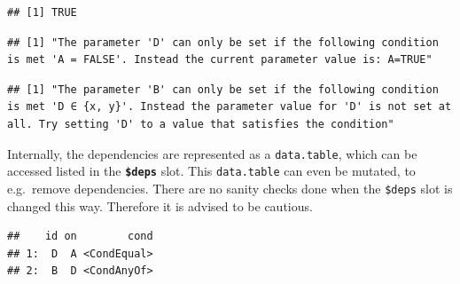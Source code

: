 \documentclass[]{article}
\newenvironment{Shaded}{\begin{snugshade}}{\end{snugshade}}
\newcommand{\CommentTok}[1]{\textcolor[rgb]{0.56,0.35,0.01}{\textit{#1}}}
\newcommand{\DataTypeTok}[1]{\textcolor[rgb]{0.13,0.29,0.53}{#1}}
\newcommand{\DecValTok}[1]{\textcolor[rgb]{0.00,0.00,0.81}{#1}}
\newcommand{\KeywordTok}[1]{\textcolor[rgb]{0.13,0.29,0.53}{\textbf{#1}}}
\newcommand{\NormalTok}[1]{#1}
\newcommand{\OperatorTok}[1]{\textcolor[rgb]{0.81,0.36,0.00}{\textbf{#1}}}
\newcommand{\OtherTok}[1]{\textcolor[rgb]{0.56,0.35,0.01}{#1}}
\newcommand{\StringTok}[1]{\textcolor[rgb]{0.31,0.60,0.02}{#1}}
\renewenvironment{Shaded} {\begin{snugshade}\small} {\end{snugshade}}
\begin{document}
\begin{verbatim}
## [1] TRUE
\end{verbatim}

\begin{Shaded}
\end{Shaded}

\begin{verbatim}
## [1] "The parameter 'D' can only be set if the following condition is met 'A = FALSE'. Instead the current parameter value is: A=TRUE"
\end{verbatim}

\begin{Shaded}
\end{Shaded}

\begin{verbatim}
## [1] "The parameter 'B' can only be set if the following condition is met 'D ∈ {x, y}'. Instead the parameter value for 'D' is not set at all. Try setting 'D' to a value that satisfies the condition"
\end{verbatim}

Internally, the dependencies are represented as a \texttt{data.table}, which can be accessed listed in the \textbf{\texttt{\$deps}} slot.
This \texttt{data.table} can even be mutated, to e.g.~remove dependencies.
There are no sanity checks done when the \texttt{\$deps} slot is changed this way.
Therefore it is advised to be cautious.

\begin{Shaded}
\end{Shaded}

\begin{verbatim}
##    id on        cond
## 1:  D  A <CondEqual>
## 2:  B  D <CondAnyOf>
\end{verbatim}
\end{document}
